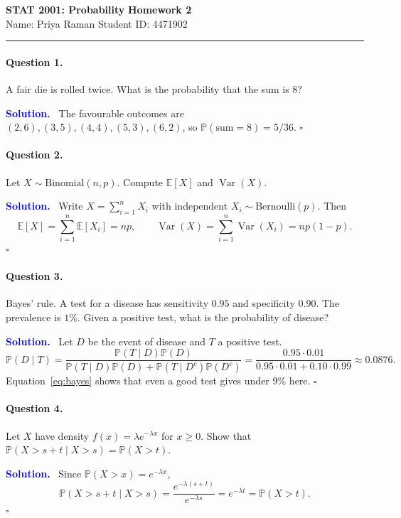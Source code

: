 \documentclass{article}
\newenvironment{solution}{\par\noindent\textbf{\textcolor{blue}{Solution.}}\ }{\hfill$\square$\par\medskip}
\newcommand{\Prob}{\mathbb{P}}
\newcommand{\E}{\mathbb{E}}
\newcommand{\Var}{\operatorname{Var}}
\begin{document}
\noindent\textbf{STAT 2001: Probability} \hfill \textbf{Homework 2}\\
\noindent Name: Priya Raman \hfill Student ID: 4471902
\par\noindent\rule{\textwidth}{0.4pt}

\paragraph{Question 1.} A fair die is rolled twice. What is the probability that the sum is 8?

\begin{solution}
The favourable outcomes are $(2,6),(3,5),(4,4),(5,3),(6,2)$, so
$\Prob(\text{sum}=8) = 5/36$.
\end{solution}

\paragraph{Question 2.} Let $X\sim\mathrm{Binomial}(n,p)$. Compute $\E[X]$ and $\Var(X)$.

\begin{solution}
Write $X = \sum_{i=1}^{n} X_i$ with independent $X_i \sim \mathrm{Bernoulli}(p)$. Then
\[
\E[X] = \sum_{i=1}^{n}\E[X_i] = np, \qquad
\Var(X) = \sum_{i=1}^{n}\Var(X_i) = np(1-p).
\]
\end{solution}

\paragraph{Question 3.} Bayes' rule. A test for a disease has sensitivity $0.95$ and
specificity $0.90$. The prevalence is $1\%$. Given a positive test, what is the
probability of disease?

\begin{solution}
Let $D$ be the event of disease and $T$ a positive test.
\begin{equation}
\Prob(D \mid T) = \frac{\Prob(T\mid D)\Prob(D)}{\Prob(T\mid D)\Prob(D) + \Prob(T\mid D^c)\Prob(D^c)}
 = \frac{0.95\cdot 0.01}{0.95\cdot0.01 + 0.10\cdot 0.99} \approx 0.0876.
\label{eq:bayes}
\end{equation}
Equation~\eqref{eq:bayes} shows that even a good test gives under 9\% here.
\end{solution}

\paragraph{Question 4.} Let $X$ have density $f(x) = \lambda e^{-\lambda x}$ for $x\ge 0$.
Show that $\Prob(X > s+t \mid X > s) = \Prob(X>t)$.

\begin{solution}
Since $\Prob(X>x) = e^{-\lambda x}$,
\[
\Prob(X>s+t\mid X>s) = \frac{e^{-\lambda(s+t)}}{e^{-\lambda s}} = e^{-\lambda t} = \Prob(X>t).
\]
\end{solution}
\end{document}
